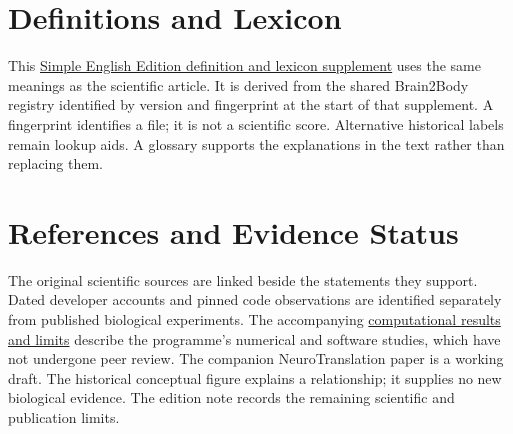 \section{Definitions and Lexicon}

This \hyperref[programme-definitions]{Simple English Edition definition and lexicon supplement} uses the same meanings as the scientific article. It is derived from the shared Brain2Body registry identified by version and fingerprint at the start of that supplement. A fingerprint identifies a file; it is not a scientific score. Alternative historical labels remain lookup aids. A glossary supports the explanations in the text rather than replacing them.\par

\section{References and Evidence Status}

The original scientific sources are linked beside the statements they support.
Dated developer accounts and pinned code observations are identified separately
from published biological experiments. The accompanying
\href{research-evidence.json}{computational results and limits} describe the
programme's numerical and software studies, which have not undergone peer
review. The companion NeuroTranslation paper is a working draft. The historical
conceptual figure explains a relationship; it supplies no new biological
evidence. The edition note records the remaining scientific and publication
limits.\par

